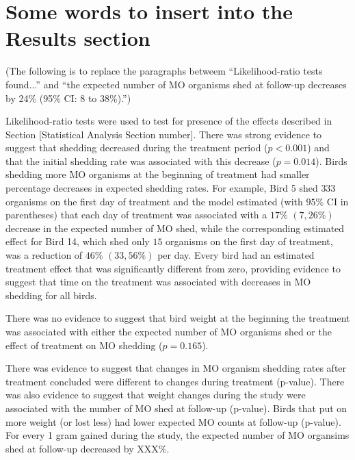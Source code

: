 \documentclass[11pt]{article}\usepackage[]{graphicx}\usepackage[]{color}
\begin{document}
\section{Some words to insert into the Results section}

(The following is to replace the paragraphs betweem ``Likelihood-ratio
tests found...'' and ``the expected number of MO organisms shed at
follow-up decreases by 24\% (95\% CI: 8 to 38\%).'')

\vspace{1em}

Likelihood-ratio tests were used to test for presence of the effects
described in Section [Statistical Analysis Section number]. There was
strong evidence to suggest that shedding decreased during the
treatment period ($p < 0.001$) and that the initial
shedding rate was associated with this decrease
($p = 0.014$). Birds shedding more MO organisms at the
beginning of treatment had smaller percentage decreases in expected
shedding rates. For example, Bird 5 shed $333$
organisms on the first day of treatment and the model estimated (with
$95\%$ CI in parentheses) that each day of treatment was associated
with a $17\%$
$(7,
26\%)$ decrease in the
expected number of MO shed, while the corresponding estimated effect
for Bird 14, which shed only $15$ organisms on
the first day of treatment, was a reduction of
$46\%$
$(33,
56\%)$ per day. Every bird
had an estimated treatment effect that was significantly different
from zero, providing evidence to suggest that time on the treatment
was associated with decreases in MO shedding for all birds.

There was no evidence to suggest that bird weight at the beginning the
treatment was associated with either the expected number of MO
organisms shed or the effect of treatment on MO shedding
($p = 0.165$).

There was evidence to suggest that changes in MO organism shedding
rates after treatment concluded were different to changes during
treatment (p-value). There was also evidence to suggest that weight
changes during the study were associated with the number of MO shed at
follow-up (p-value). Birds that put on more weight (or lost less) had
lower expected MO counts at follow-up (p-value). For every 1 gram
gained during the study, the expected number of MO organsims shed at
follow-up decreased by XXX\%.
\end{document}
